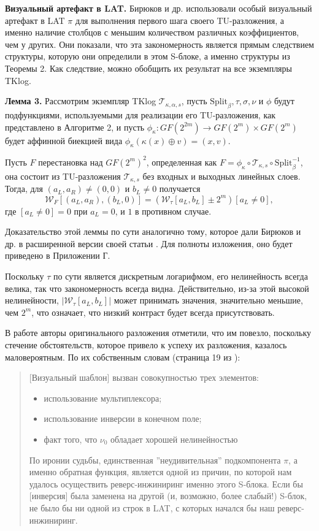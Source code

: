 \textbf{Визуальный артефакт в LAT.} Бирюков и др. использовали особый визуальный артефакт в LAT \(\pi\) для выполнения первого шага своего TU-разложения, а именно наличие столбцов с меньшим количеством различных коэффициентов, чем у других. Они показали, что эта закономерность является прямым следствием структуры, которую они определили в этом S-блоке, а именно структуры из Теоремы 2. Как следствие, можно обобщить их результат на все экземпляры TKlog.

\textbf{Лемма 3.}
Рассмотрим экземпляр TKlog \(\mathscr{T}_{\kappa,\alpha,s}\), пусть \(\text{Split}_{\beta}, \tau, \sigma, \nu\) и \(\phi\) будут подфункциями, используемыми для реализации его TU-разложения, как представлено в Алгоритме 2, и пусть \(\phi_{\kappa} : GF(2^{2m}) \to GF(2^m) \times GF(2^m)\) будет аффинной биекцией вида \(\phi_{\kappa}(\kappa(x) \oplus v) = (x, v)\).

Пусть \(F\) перестановка над \(GF (2^m)^2\), определенная как \(F = \phi_{\kappa} \circ \mathscr{T}_{\kappa,s} \circ \text{Split}^{-1}_{\beta}\), она состоит из TU-разложения \(\mathscr{T}_{\kappa,s}\) без входных и выходных линейных слоев. Тогда, для \((a_L, a_R) \neq (0, 0)\) и \(b_L \neq 0\) получается
\[
\mathcal{W}_{F}[(a_L, a_R), (b_L, 0)] = \left(\mathcal{W}_{\tau}[a_L, b_L] \pm 2^m\right)[a_L \neq 0],
\]
где \([a_L \neq 0] = 0\) при \(a_L = 0\), и \(1\) в противном случае.

Доказательство этой леммы по сути аналогично тому, которое дали Бирюков и др. в расширенной версии своей статьи \cite{BPU16b}. Для полноты изложения, оно будет приведено в Приложении Г. 

Поскольку \(\tau\) по сути является дискретным логарифмом, его нелинейность всегда велика, так что закономерность всегда видна. Действительно, из-за этой высокой нелинейности, \(|\mathcal{W}_{\tau}[a_L, b_L]|\) может принимать значения, значительно меньшие, чем \(2^m\), что означает, что низкий контраст будет всегда присутствовать.

В работе \cite{BPU16a} авторы оригинального разложения отметили, что им повезло, поскольку стечение обстоятельств, которое привело к успеху их разложения, казалось маловероятным. По их собственным словам (страница 19 из \cite{BPU16b}):
\begin{quote}
[Визуальный шаблон] вызван совокупностью трех элементов:
\begin{itemize}
\item использование мультиплексора;
\item использование инверсии в конечном поле;
\item факт того, что \(\nu_0\) обладает хорошей нелинейностью
\end{itemize}
По иронии судьбы, единственная ''неудивительная'' подкомпонента \(\pi\), а именно обратная функция, является одной из причин, по которой нам удалось осуществить реверс-инжиниринг именно этого S-блока. Если бы [инверсия] была заменена на другой (и, возможно, более слабый!) S-блок, не было бы ни одной из строк в LAT, с которых начался бы наш реверс-инжиниринг.
\end{quote}

